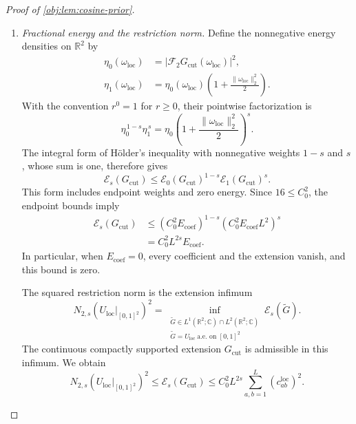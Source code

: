 \documentclass[11pt]{article}
\begin{document}
\begin{proof}[Proof of \cref{obj:lem:cosine-prior}]
\begin{enumerate}
\item \emph{Fractional energy and the restriction norm.}
Define the nonnegative energy densities on \(\mathbb R^2\) by
\[
\begin{aligned}
\eta_0(\omega_{\mathrm{loc}})
&=|\mathcal F_2G_{\mathrm{cut}}(\omega_{\mathrm{loc}})|^2,\\
\eta_1(\omega_{\mathrm{loc}})
&=\eta_0(\omega_{\mathrm{loc}})
 \left(1+\frac{\|\omega_{\mathrm{loc}}\|_2^2}{2}\right).
\end{aligned}
\]
With the convention \(r^0=1\) for \(r\geq0\), their pointwise factorization is
\[
\eta_0^{\,1-s}\eta_1^{\,s}
=\eta_0
 \left(1+\frac{\|\omega_{\mathrm{loc}}\|_2^2}{2}\right)^s.
\]
The integral form of Hölder's inequality with nonnegative weights
\(1-s\) and \(s\), whose sum is one, therefore gives
\[
\mathcal E_s(G_{\mathrm{cut}})
\leq
\mathcal E_0(G_{\mathrm{cut}})^{1-s}
\mathcal E_1(G_{\mathrm{cut}})^s.
\]
This form includes endpoint weights and zero energy. Since
\(16\leq C_0^2\), the endpoint bounds imply
\[
\begin{aligned}
\mathcal E_s(G_{\mathrm{cut}})
&\leq
 (C_0^2E_{\mathrm{coef}})^{1-s}
 (C_0^2E_{\mathrm{coef}}L^2)^s\\
&=C_0^2L^{2s}E_{\mathrm{coef}}.
\end{aligned}
\]
In particular, when \(E_{\mathrm{coef}}=0\), every coefficient and the
extension vanish, and this bound is zero.

The squared restriction norm is the extension infimum
\[
N_{2,s}(U_{\mathrm{loc}}|_{[0,1]^2})^2
=
\inf_{\substack{
 \widetilde G\in L^1(\mathbb R^2;\mathbb C)\cap L^2(\mathbb R^2;\mathbb C)\\
 \widetilde G=U_{\mathrm{loc}}\ \text{a.e.\ on }[0,1]^2}}
 \mathcal E_s(\widetilde G).
\]
The continuous compactly supported extension \(G_{\mathrm{cut}}\) is
admissible in this infimum. We obtain
\[
N_{2,s}(U_{\mathrm{loc}}|_{[0,1]^2})^2
\leq
\mathcal E_s(G_{\mathrm{cut}})
\leq C_0^2L^{2s}
 \sum_{a,b=1}^L(c^{\mathrm{loc}}_{ab})^2.
\]


\end{enumerate}
\end{proof}
\end{document}
